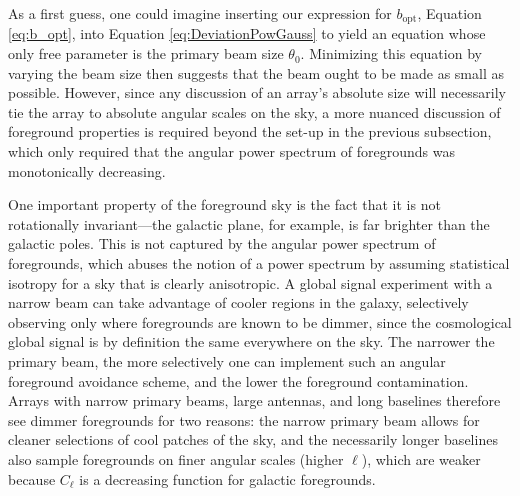 \documentclass[twocolumn,apj,numberedappendix]{emulateapj}
\begin{document}
As a first guess, one could imagine inserting our expression for $b_\textrm{opt}$, Equation \eqref{eq:b_opt}, into Equation \eqref{eq:DeviationPowGauss} to yield an equation whose only free parameter is the primary beam size $\theta_0$. Minimizing this equation by varying the beam size then suggests that the beam ought to be made as small as possible. However, since any discussion of an array's absolute size will necessarily tie the array to absolute angular scales on the sky, a more nuanced discussion of foreground properties is required beyond the set-up in the previous subsection, which only required that the angular power spectrum of foregrounds was monotonically decreasing.

One important property of the foreground sky is the fact that it is not rotationally invariant---the galactic plane, for example, is far brighter than the galactic poles. This is not captured by the angular power spectrum of foregrounds, which abuses the notion of a power spectrum by assuming statistical isotropy for a sky that is clearly anisotropic. A global signal experiment with a narrow beam can take advantage of cooler regions in the galaxy, selectively observing only where foregrounds are known to be dimmer, since the cosmological global signal is by definition the same everywhere on the sky. The narrower the primary beam, the more selectively one can implement such an angular foreground avoidance scheme, and the lower the foreground contamination. Arrays with narrow primary beams, large antennas, and long baselines therefore see dimmer foregrounds for two reasons: the narrow primary beam allows for cleaner selections of cool patches of the sky, and the necessarily longer baselines also sample foregrounds on finer angular scales (higher $\ell$), which are weaker because $C_\ell$ is a decreasing function for galactic foregrounds.
\end{document}

